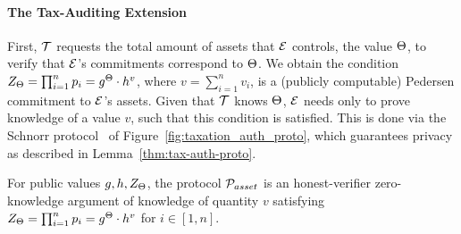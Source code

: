 \paragraph{The Tax-Auditing Extension}\label{subsec:tax-authority-proto}
First, $\mathcal{T}$ requests the total amount of assets that $\mathcal{E}$
controls, \ie the value $\Theta$, to verify that $\mathcal{E}$'s commitments
correspond to $\Theta$. We obtain the condition
$Z_\Theta = \prod_{i = 1}^n p_i = g^{\Theta} \cdot h^v$,
where $v = {\sum_{i = 1}^n v_i}$, is a (publicly
computable) Pedersen commitment to $\mathcal{E}$'s assets. Given that $\mathcal{T}$
knows $\Theta$, $\mathcal{E}$ needs only to prove knowledge of a value $v$, such
that this condition is satisfied. This is done via the Schnorr
protocol~\cite{C:Schnorr89} of Figure~\ref{fig:taxation_auth_proto}, which
guarantees privacy as described in Lemma~\ref{thm:tax-auth-proto}.



\begin{lemma}\label{thm:tax-auth-proto}
    For public values $g, h, Z_\Theta$, the protocol $\mathcal{P}_{asset}$ is an
    honest-verifier zero-knowledge argument of knowledge of quantity $v$
    satisfying
    $Z_\Theta = \prod_{i = 1}^n p_i = g^{\Theta} \cdot h^v$ for $i \in [1, n]$.
\end{lemma}

